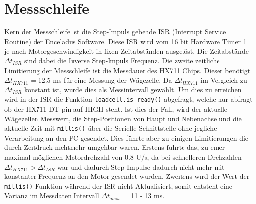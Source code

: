 \section{Messschleife}
\label{sec:Messschleife}

Kern der Messschleife ist die Step-Impuls gebende ISR (Interrupt Service Routine) der Enceladus Software.
Diese ISR wird vom 16 bit Hardware Timer 1 je nach Motorgeschwindigkeit in fixen Zeitabständen ausgelöst.
Die Zeitabstände $\Delta t_{ISR}$ sind dabei die Inverse Step-Impuls Frequenz.
Die zweite zeitliche Limitierung der Messschleife ist die Messdauer des HX711 Chips.
Dieser benötigt $\Delta t_{HX711}$ = 12.5 \si{\milli\second} für eine Messung der Wägezelle.
Da $\Delta t_{HX711}$ im Vergleich zu $\Delta t_{ISR}$ konstant ist, wurde dies als Messintervall gewählt.
Um dies zu erreichen wird in der ISR die Funktion \verb|loadcell.is_ready()| abgefragt, welche nur abfragt ob der HX711 DT pin auf HIGH steht.
Ist dies der Fall, wird der aktuelle Wägezellen Messwert, die Step-Positionen von Haupt und Nebenachse und die aktuelle Zeit mit \verb|millis()| über die Serielle Schnittstelle ohne jegliche Verarbeitung an den PC gesendet.
Dies führte aber zu einigen Limitierungen die durch Zeitdruck nichtmehr umgehbar waren.
Erstens führte das, zu einer maximal möglichen Motordrehzahl von 0.8 U/s, da bei schnelleren Drehzahlen $\Delta t_{HX711} > \Delta t_{ISR}$ war und dadurch Step-Impulse dadurch nicht mehr mit konstanter Frequenz an den Motor gesendet wurden.
Zweitens wird der Wert der \verb|millis()| Funktion während der ISR nicht Aktualisiert, somit entsteht eine Varianz im Messdaten Intervall $\Delta t_{mess}$ = 11 - 13 \si{\milli\second}.

